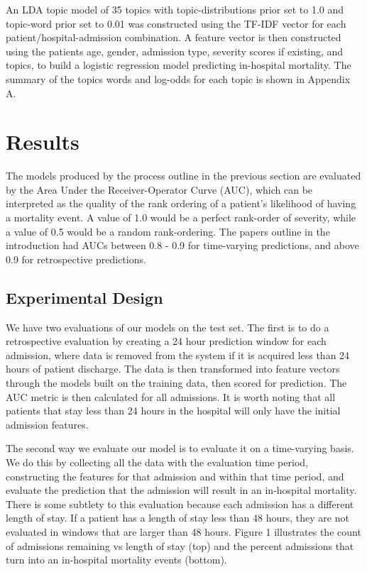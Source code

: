 \documentclass[journal]{IEEEtran}
\begin{document}
An LDA topic model of 35 topics with topic-distributions prior set to 1.0 and topic-word prior set to 0.01 was constructed using the TF-IDF vector for each patient/hospital-admission combination.  A feature vector is then constructed using the patients age, gender, admission type, severity scores if existing, and topics, to build a logistic regression model predicting in-hospital mortality.  The summary of the topics words and log-odds for each topic is shown in Appendix A.

\section{Results}

The models produced by the process outline in the previous section are evaluated by the Area Under the Receiver-Operator Curve (AUC), which can be interpreted as the quality of the rank ordering of a patient's likelihood of having a mortality event.   A value of 1.0 would be a perfect rank-order of severity, while a value of 0.5 would be a random rank-ordering.   The papers outline in the introduction had AUCs between 0.8 - 0.9 for time-varying predictions, and above 0.9 for retrospective predictions.


\subsection{Experimental Design}

We have two evaluations of our models on the test set.   The first is to do a retrospective evaluation by creating a 24 hour prediction window for each admission, where data is removed from the system if it is acquired less than 24 hours of patient discharge.  The data is then transformed into feature vectors through the models built on the training data, then scored for prediction.   The AUC metric is then calculated for all admissions.   It is worth noting that all patients that stay less than 24 hours in the hospital will only have the initial admission features.   

The second way we evaluate our model is to evaluate it on a time-varying basis.  We do this by collecting all the data with the evaluation time period, constructing the features for that admission and within that time period, and evaluate the prediction that the admission will result in an in-hospital mortality.   There is some subtlety to this evaluation because each admission has a different length of stay.  If a patient has a length of stay less than 48 hours, they are not evaluated in windows that are larger than 48 hours.  Figure 1 illustrates the count of admissions remaining vs length of stay (top) and the percent admissions that turn into an in-hospital mortality events (bottom).  
\end{document}
